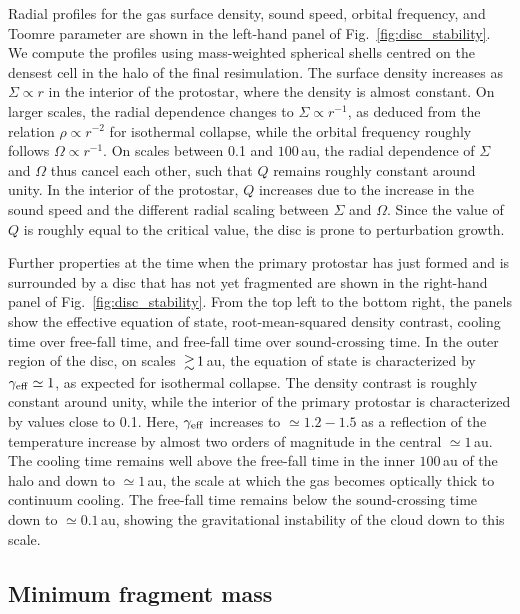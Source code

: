 \documentclass[useAMS,usenatbib]{mnras}
\newcommand{\geff}{\gamma_{\rm eff}}
\begin{document}
Radial profiles for the gas surface density, sound speed, orbital frequency, and Toomre parameter are shown in the left-hand panel of Fig.~\ref{fig:disc_stability}. We compute the profiles using mass-weighted spherical shells centred on the densest cell in the halo of the final resimulation. The surface density increases as $\Sigma \propto r$ in the interior of the protostar, where the density is almost constant. On larger scales, the radial dependence changes to $\Sigma \propto r^{-1}$, as deduced from the relation $\rho \propto r^{-2}$ for isothermal collapse, while the orbital frequency roughly follows $\Omega \propto r^{-1}$. On scales between 0.1 and $100\,$au, the radial dependence of $\Sigma$ and $\Omega$ thus cancel each other, such that $Q$ remains roughly constant around unity. In the interior of the protostar, $Q$ increases due to the increase in the sound speed and the different radial scaling between $\Sigma$ and $\Omega$. Since the value of $Q$ is roughly equal to the critical value, the disc is prone to perturbation growth.

Further properties at the time when the primary protostar has just formed and is surrounded by a disc that has not yet fragmented are shown in the right-hand panel of Fig.~\ref{fig:disc_stability}. From the top left to the bottom right, the panels show the effective equation of state, root-mean-squared density contrast, cooling time over free-fall time, and free-fall time over sound-crossing time. In the outer region of the disc, on scales $\ga 1\,$au, the equation of state is characterized by $\geff \simeq 1$, as expected for isothermal collapse. The density contrast is roughly constant around unity, while the interior of the primary protostar is characterized by values close to 0.1. Here, $\geff$ increases to $\simeq 1.2 - 1.5$ as a reflection of the temperature increase by almost two orders of magnitude in the central $\simeq 1\,$au. The cooling time remains well above the free-fall time in the inner $100\,$au of the halo and down to $\simeq 1\,$au, the scale at which the gas becomes optically thick to continuum cooling. The free-fall time remains below the sound-crossing time down to $\simeq 0.1\,$au, showing the gravitational instability of the cloud down to this scale.

\subsection{Minimum fragment mass}
\label{subsec:mbe}
\end{document}

